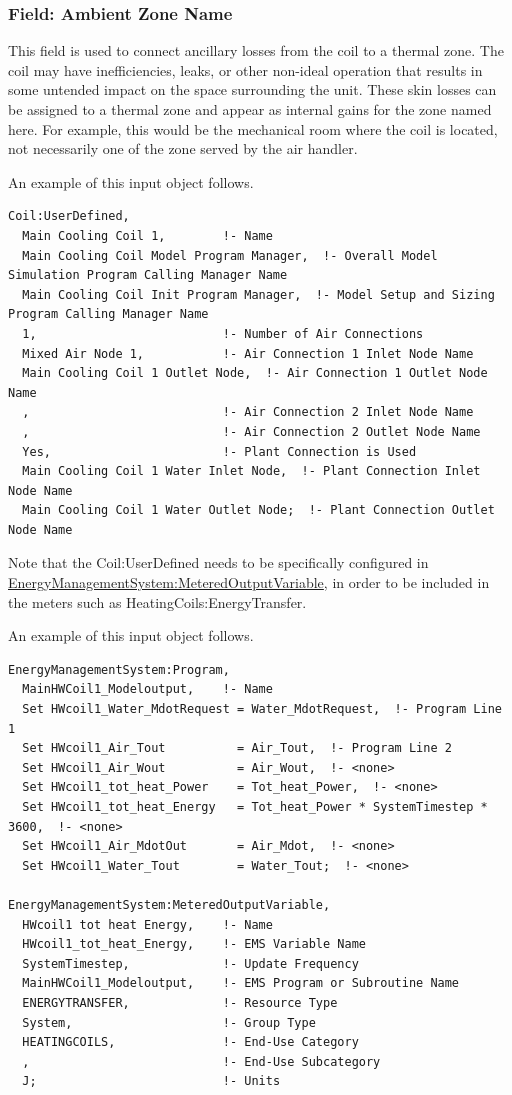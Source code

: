 \subsubsection{Field: Ambient Zone Name}\label{field-ambient-zone-name-2}

This field is used to connect ancillary losses from the coil to a thermal zone. The coil may have inefficiencies, leaks, or other non-ideal operation that results in some untended impact on the space surrounding the unit. These skin losses can be assigned to a thermal zone and appear as internal gains for the zone named here. For example, this would be the mechanical room where the coil is located, not necessarily one of the zone served by the air handler.

An example of this input object follows.

\begin{lstlisting}
Coil:UserDefined,
  Main Cooling Coil 1,        !- Name
  Main Cooling Coil Model Program Manager,  !- Overall Model Simulation Program Calling Manager Name
  Main Cooling Coil Init Program Manager,  !- Model Setup and Sizing Program Calling Manager Name
  1,                          !- Number of Air Connections
  Mixed Air Node 1,           !- Air Connection 1 Inlet Node Name
  Main Cooling Coil 1 Outlet Node,  !- Air Connection 1 Outlet Node Name
  ,                           !- Air Connection 2 Inlet Node Name
  ,                           !- Air Connection 2 Outlet Node Name
  Yes,                        !- Plant Connection is Used
  Main Cooling Coil 1 Water Inlet Node,  !- Plant Connection Inlet Node Name
  Main Cooling Coil 1 Water Outlet Node;  !- Plant Connection Outlet Node Name
\end{lstlisting}

Note that the Coil:UserDefined needs to be specifically configured in \hyperref[energymanagementsystemmeteredoutputvariable]{EnergyManagementSystem:MeteredOutputVariable}, in order to be included in the meters such as HeatingCoils:EnergyTransfer.

An example of this input object follows.

\begin{lstlisting}
EnergyManagementSystem:Program,
  MainHWCoil1_Modeloutput,    !- Name
  Set HWcoil1_Water_MdotRequest = Water_MdotRequest,  !- Program Line 1
  Set HWcoil1_Air_Tout          = Air_Tout,  !- Program Line 2
  Set HWcoil1_Air_Wout          = Air_Wout,  !- <none>
  Set HWcoil1_tot_heat_Power    = Tot_heat_Power,  !- <none>
  Set HWcoil1_tot_heat_Energy   = Tot_heat_Power * SystemTimestep * 3600,  !- <none>
  Set HWcoil1_Air_MdotOut       = Air_Mdot,  !- <none>
  Set HWcoil1_Water_Tout        = Water_Tout;  !- <none>

EnergyManagementSystem:MeteredOutputVariable,
  HWcoil1 tot heat Energy,    !- Name
  HWcoil1_tot_heat_Energy,    !- EMS Variable Name
  SystemTimestep,             !- Update Frequency
  MainHWCoil1_Modeloutput,    !- EMS Program or Subroutine Name
  ENERGYTRANSFER,             !- Resource Type
  System,                     !- Group Type
  HEATINGCOILS,               !- End-Use Category
  ,                           !- End-Use Subcategory
  J;                          !- Units
\end{lstlisting}

